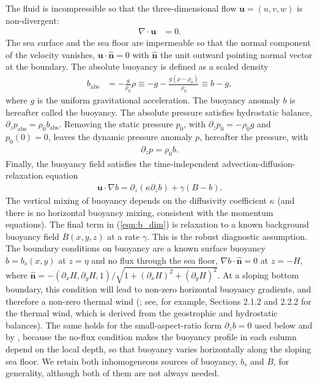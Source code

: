 \documentclass{ametsocV6.2}
\begin{document}
The fluid is incompressible so that the three-dimensional flow ${\mathbf u} = (u,v,w)$ is non-divergent:
\begin{align}
\nabla \cdot {\mathbf u} & = 0 .
\end{align}
The sea surface and the sea floor are impermeable so that the normal component of the velocity vanishes, $\mathbf{u} \cdot \hat{\mathbf{n}} = 0$ with $\hat{\mathbf{n}}$ the unit outward pointing normal vector at the boundary.
The absolute buoyancy is defined as a scaled density 
\begin{align}
b_{\mathrm{abs}}  & = -\frac{g}{\rho_0} \rho \equiv -g - \frac{g (\rho - \rho_0)}{\rho_0} \equiv b - g,
\end{align}
where $g$ is the uniform gravitational acceleration.
The buoyancy anomaly $b$ is hereafter called the buoyancy.
The absolute pressure satisfies hydrostatic balance, $\partial_z p_{\mathrm{abs}} = \rho_0 b_{\mathrm{abs}}$. Removing the static pressure $p_0$, with $\partial_z p_0 = -\rho_0 g$ and $p_0(0) = 0$, leaves the dynamic pressure anomaly $p$, hereafter the pressure, with
\begin{align}
\partial_z p = \rho_0 b .
\label{eqn:dimensional_hydrostatic}
\end{align}
Finally, the buoyancy field satisfies the time-independent advection-diffusion-relaxation equation
\begin{align}
{\mathbf u} \cdot \nabla b  =  \partial_{z} \left( \kappa \partial_z b \right) + \gamma \left( B - b \right).
\label{eqn:b_dim}
\end{align}
The vertical mixing of buoyancy depends on the diffusivity coefficient $\kappa$ (and there is no horizontal buoyancy mixing, consistent with the momentum equations).
The final term in (\ref{eqn:b_dim}) is relaxation to a known background buoyancy field $B(x,y,z)$ at a rate $\gamma$. 
This is the robust diagnostic assumption.
The boundary conditions on buoyancy are a known surface buoyancy $b = b_s(x,y)$ at $z = \eta$ and no flux through the sea floor, $\nabla b \cdot \hat{\mathbf{n}} = 0$ at $z = -H$, where $\hat{\mathbf{n}} = -(\partial_x H, \partial_y H, 1)/\sqrt{1 + (\partial_x H)^2 + (\partial_y H)^2}$.
At a sloping bottom boundary, this condition will lead to non-zero horizontal buoyancy gradients, and therefore a non-zero thermal wind (\citealt{peterson&callies26}; see, for example, \citealt{klinger&haine19} Sections 2.1.2 and 2.2.2 for the thermal wind, which is derived from the geostrophic and hydrostatic balances).
The same holds for the small-aspect-ratio form $\partial_z b = 0$ used below and by \citet{peterson&callies26}, because the no-flux condition makes the buoyancy profile in each column depend on the local depth, so that buoyancy varies horizontally along the sloping sea floor.
We retain both inhomogeneous sources of buoyancy, $b_s$ and $B$, for generality, although both of them are not always needed.
\end{document}
